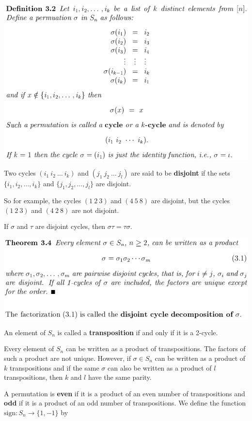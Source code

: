 \documentclass{article}
\begin{document}
\includegraphics[scale=0.45]{cycle}

Two cycles \((i_1 \ i_2 \ \ldots \ i_k)\) and \((j_1 \ j_2 \ \ldots \ j_l)\) are said to be \textbf{disjoint} if the sets \(\{i_1, i_2, \ldots, i_k\}\) and \(\{j_1, j_2, \ldots, j_l\}\) are disjoint.

So for example, the cycles \((1 \ 2 \ 3)\) and \((4 \ 5 \ 8)\) are disjoint, but the cycles \((1 \ 2 \ 3)\) and \((4 \ 2 \ 8)\) are not disjoint.

If \(\sigma\) and \(\tau\) are disjoint cycles, then \(\sigma \tau = \tau \sigma\).

\includegraphics[scale=0.45]{disjoint_cycle_decomp}

An element of \(S_n\) is called a \textbf{transposition} if and only if it is a 2-cycle. 

Every element of \(S_n\) can be written as a product of transpositions. The factors of such a product are not unique. However, if \(\sigma \in S_n\) can be written as a product of \(k\) transpositions and if the same \(\sigma\) can also be written as a product of \(l\) transpositions, then \(k\) and \(l\) have the same parity.

A permutation is \textbf{even} if it is a product of an even number of transpositions and \textbf{odd} if it is a product of an odd number of transpositions. We define the function \(\text{sign} : S_n \to \{1, -1\}\) by 
\end{document}
